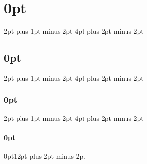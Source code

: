 
\usepackage[tmargin=2.2cm,bmargin=2.2cm,lmargin=2.5cm,rmargin=2.5cm]{geometry}
\setlength{\parindent}{0pt} %
\setlength{\parskip}{\baselineskip} %
\setlength{\baselineskip}{2.5pt}


\usepackage{titlesec}
\titlespacing\section{0pt}{2pt plus 1pt minus 2pt}{-4pt plus 2pt minus 2pt}
\titlespacing\subsection{0pt}{2pt plus 1pt minus 2pt}{-4pt plus 2pt minus 2pt}
\titlespacing\subsubsection{0pt}{2pt plus 1pt minus 2pt}{-4pt plus 2pt minus 2pt}
\titlespacing\paragraph{0pt}{0pt}{12pt plus 2pt minus 2pt}

\usepackage{enumitem}


\usepackage[colorlinks=true,urlcolor=blue!30!black,linkcolor=blue!30!black,urlbordercolor={1 0 0},pdfborder=0]{hyperref}

\usepackage{graphicx} %
\graphicspath{{resources/}}
\usepackage{float}


\usepackage{tabularx}
\usepackage{amsmath,amsfonts,amsthm,amssymb}
\usepackage[usenames,dvipsnames,svgnames,table]{xcolor}


\usepackage{pdflscape}


\usepackage{minitoc}
\renewcommand{\mtctitle}{}   %
\setcounter{minitocdepth}{1} %
\nomtcrule                   %

